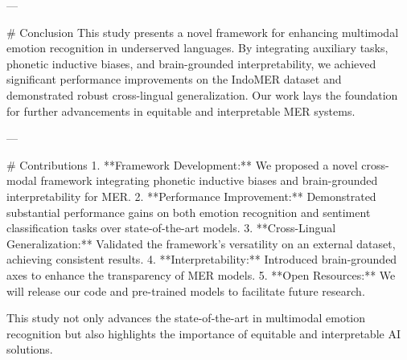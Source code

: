 ---

# Conclusion  
This study presents a novel framework for enhancing multimodal emotion recognition in underserved languages. By integrating auxiliary tasks, phonetic inductive biases, and brain-grounded interpretability, we achieved significant performance improvements on the IndoMER dataset and demonstrated robust cross-lingual generalization. Our work lays the foundation for further advancements in equitable and interpretable MER systems.  

---

# Contributions  
1. **Framework Development:** We proposed a novel cross-modal framework integrating phonetic inductive biases and brain-grounded interpretability for MER.  
2. **Performance Improvement:** Demonstrated substantial performance gains on both emotion recognition and sentiment classification tasks over state-of-the-art models.  
3. **Cross-Lingual Generalization:** Validated the framework's versatility on an external dataset, achieving consistent results.  
4. **Interpretability:** Introduced brain-grounded axes to enhance the transparency of MER models.  
5. **Open Resources:** We will release our code and pre-trained models to facilitate future research.  

This study not only advances the state-of-the-art in multimodal emotion recognition but also highlights the importance of equitable and interpretable AI solutions.